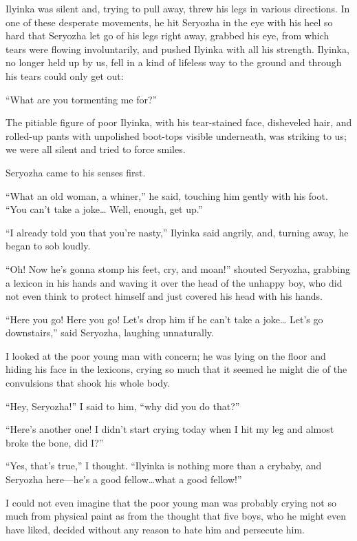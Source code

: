 Ilyinka was silent and, trying to pull away, threw his legs in various directions. In one of these desperate movements, he hit Seryozha in the eye with his heel so hard that Seryozha let go of his legs right away, grabbed his eye, from which tears were flowing involuntarily, and pushed Ilyinka with all his strength. Ilyinka, no longer held up by us, fell in a kind of lifeless way to the ground and through his tears could only get out:

``What are you tormenting me for?'' %

The pitiable figure of poor Ilyinka, with his tear-stained face, disheveled hair, and rolled-up pants with unpolished boot-tops visible underneath, was striking to us; we were all silent and tried to force smiles.

Seryozha came to his senses first.

``What an old woman, a whiner,'' he said, touching him gently with his foot. ``You can't take a joke\ldots{} Well, enough, get up.'' %

``I already told you that you're nasty,'' Ilyinka said angrily, and, turning away, he began to sob loudly. %

``Oh! Now he's gonna stomp his feet, cry, and moan!'' shouted Seryozha, grabbing a lexicon in his hands and waving it over the head of the unhappy boy, who did not even think to protect himself and just covered his head with his hands.

``Here you go! Here you go! Let's drop him if he can't take a joke\ldots{} Let's go downstairs,'' said Seryozha, laughing unnaturally. %

I looked at the poor young man with concern; he was lying on the floor and hiding his face in the lexicons, crying so much that it seemed he might die of the convulsions that shook his whole body.

``Hey, Seryozha!'' I said to him, ``why did you do that?'' %

``Here's another one! I didn't start crying today when I hit my leg and almost broke the bone, did I?'' %

``Yes, that's true,'' I thought. ``Ilyinka is nothing more than a crybaby, and Seryozha here---he's a good fellow\ldots{}what a good fellow!'' %

I could not even imagine that the poor young man was probably crying not so much from physical paint as from the thought that five boys, who he might even have liked, decided without any reason to hate him and persecute him.

